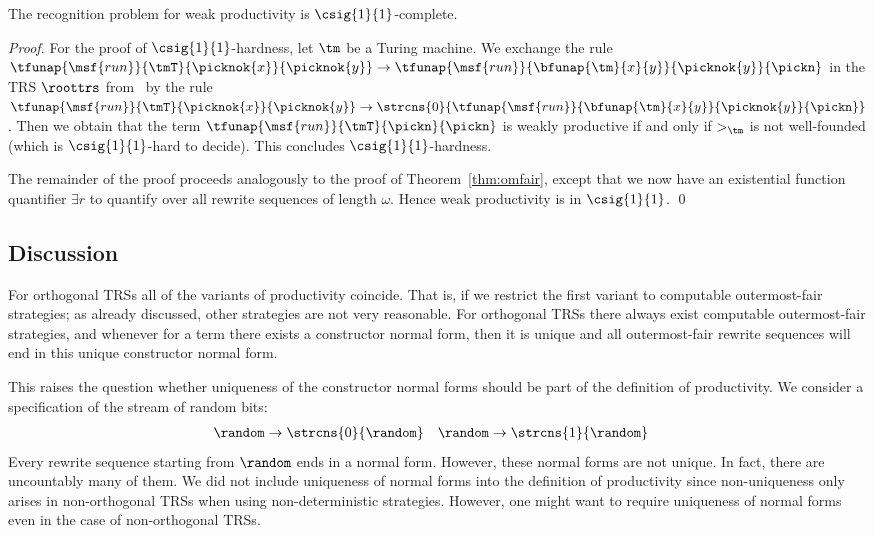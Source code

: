 \begin{theorem}\label{thm:weak}
  The recognition problem for weak productivity is $\csig{1}{1}$-complete.
\end{theorem}
\begin{proof}
  For the proof of $\csig{1}{1}$-hardness, let $\tm$ be a Turing machine.
  We exchange the rule
  $\tfunap{\msf{run}}{\tmT}{\picknok{x}}{\picknok{y}} \to \tfunap{\msf{run}}{\bfunap{\tm}{x}{y}}{\picknok{y}}{\pickn}$
  in the TRS $\roottrs$ from~\cite{endr:geuv:zant:2009}
  by 
  the rule $\tfunap{\msf{run}}{\tmT}{\picknok{x}}{\picknok{y}} \to \strcns{0}{\tfunap{\msf{run}}{\bfunap{\tm}{x}{y}}{\picknok{y}}{\pickn}}$.
  Then we obtain that the term $\tfunap{\msf{run}}{\tmT}{\pickn}{\pickn}$ is weakly productive
  if and only if ${>_\tm}$ is not well-founded (which is $\csig{1}{1}$-hard to decide).
  This concludes $\csig{1}{1}$-hardness.

  The remainder of the proof proceeds analogously
  to the proof of Theorem~\ref{thm:omfair},
  except that we now have an existential function quantifier $\exists r$ 
  to quantify over all rewrite sequences of length $\omega$.
  Hence weak productivity is in $\csig{1}{1}$.
  \qed
 \end{proof}


\subsection{Discussion}\label{sec:productivity:subsec:discussion}

For orthogonal TRSs all of the variants of productivity coincide.
That is, if we restrict the first variant to computable outermost-fair strategies;
as already discussed, other strategies are not very reasonable.
For orthogonal TRSs there always exist computable outermost-fair strategies,
and whenever for a term there exists a constructor normal form, 
then it is unique and all outermost-fair rewrite sequences will end in this unique constructor normal form.

This raises the question whether uniqueness of the constructor normal forms
should be part of the definition of productivity.
We consider a specification of the stream of random bits:
\begin{align*}
  \random &\to \strcns{0}{\random} &
  \random &\to \strcns{1}{\random}
\end{align*}
Every rewrite sequence starting from $\random$ ends in a normal form. 
However, these normal forms are not unique. In fact, there are uncountably many of them.
We did not include uniqueness of normal forms
into the definition of productivity since
non-uniqueness only arises in non-orthogonal TRSs 
when using non-deterministic strategies.
However, one might want to require uniqueness of normal forms even in the case of non-orthogonal TRSs.

